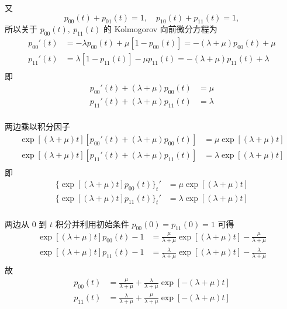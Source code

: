 \documentclass[openany]{ctexbook}
\theoremstyle{kaiti}
\theoremstyle{normal}
\begin{document}
又
\begin{equation}
  p_{00}(t)+p_{01}(t)=1,\quad p_{10}(t)+p_{11}(t)=1,
\end{equation}
所以关于 $p_{00}(t),~p_{11}(t)$ 的 Kolmogorov 向前微分方程为
\begin{equation}
  \begin{aligned}
    p_{00}'(t)&=-\lambda p_{00}(t)+\mu [1-p_{00}(t)]=-(\lambda+\mu)p_{00}(t)+\mu\\
    p_{11}'(t)&=\lambda [1-p_{11}(t)]-\mu p_{11}(t)=-(\lambda+\mu)p_{11}(t)+\lambda\\
  \end{aligned}
\end{equation}
即
\begin{equation}
  \begin{aligned}
    p_{00}'(t)+(\lambda+\mu)p_{00}(t)&=\mu\\
    p_{11}'(t)+(\lambda+\mu)p_{11}(t)&=\lambda\\
  \end{aligned}
\end{equation}

两边乘以积分因子
\begin{equation}
  \begin{aligned}
    \exp[(\lambda+\mu)t][p_{00}'(t)+(\lambda+\mu)p_{00}(t)]&=\mu\exp[(\lambda+\mu)t]\\
    \exp[(\lambda+\mu)t][p_{11}'(t)+(\lambda+\mu)p_{11}(t)]&=\lambda\exp[(\lambda+\mu)t]\\
  \end{aligned}
\end{equation}
即
\begin{equation}
  \begin{aligned}
    \{\exp[(\lambda+\mu)t]p_{00}(t)\}_t'&=\mu\exp[(\lambda+\mu)t]\\
    \{\exp[(\lambda+\mu)t]p_{11}(t)\}_t'&=\lambda\exp[(\lambda+\mu)t]\\
  \end{aligned}
\end{equation}

两边从 $0$ 到 $t$ 积分并利用初始条件 $p_{00}(0)=p_{11}(0)=1$ 可得
\begin{equation}
  \begin{aligned}
    \exp[(\lambda+\mu)t]p_{00}(t)-1&=\frac{\mu}{\lambda+\mu}\exp[(\lambda+\mu)t]-\frac{\mu}{\lambda+\mu}\\
    \exp[(\lambda+\mu)t]p_{11}(t)-1&=\frac{\lambda}{\lambda+\mu}\exp[(\lambda+\mu)t]-\frac{\lambda}{\lambda+\mu}\\
  \end{aligned}
\end{equation}
故
\begin{equation}
  \begin{aligned}
    p_{00}(t)&=\frac{\mu}{\lambda+\mu}+\frac{\lambda}{\lambda+\mu}\exp[-(\lambda+\mu)t]\\
    p_{11}(t)&=\frac{\lambda}{\lambda+\mu}+\frac{\mu}{\lambda+\mu}\exp[-(\lambda+\mu)t]\\
  \end{aligned}
\end{equation}
\end{document}
